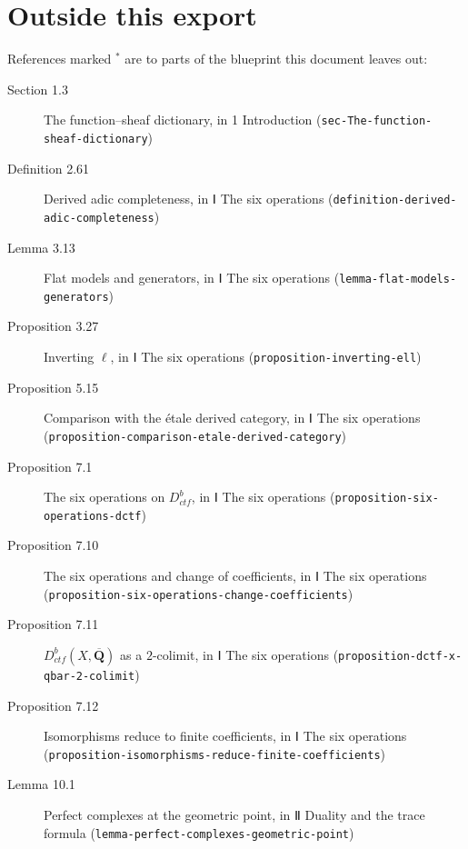 \documentclass[11pt]{article}
\newcommand{\bpslug}[1]{\texttt{#1}}
\providecommand{\Dctf}{}\renewcommand{\Dctf}{D^b_{ctf}}
\providecommand{\Qbar}{}\renewcommand{\Qbar}{\overline{\mathbf Q}}
\begin{document}
\section*{Outside this export}
References marked \ensuremath{{}^\ast} are to parts of the blueprint this document leaves out:
\begin{description}
\item[Section 1.3] The function–sheaf dictionary, in 1 Introduction (\bpslug{sec-{}\allowbreak{}The-{}\allowbreak{}function-{}\allowbreak{}sheaf-{}\allowbreak{}dictionary})
\item[Definition 2.61] Derived adic completeness, in Ⅰ The six operations (\bpslug{definition-{}\allowbreak{}derived-{}\allowbreak{}adic-{}\allowbreak{}completeness})
\item[Lemma 3.13] Flat models and generators, in Ⅰ The six operations (\bpslug{lemma-{}\allowbreak{}flat-{}\allowbreak{}models-{}\allowbreak{}generators})
\item[Proposition 3.27] Inverting $\ell$, in Ⅰ The six operations (\bpslug{proposition-{}\allowbreak{}inverting-{}\allowbreak{}ell})
\item[Proposition 5.15] Comparison with the étale derived category, in Ⅰ The six operations (\bpslug{proposition-{}\allowbreak{}comparison-{}\allowbreak{}etale-{}\allowbreak{}derived-{}\allowbreak{}category})
\item[Proposition 7.1] The six operations on $\Dctf$, in Ⅰ The six operations (\bpslug{proposition-{}\allowbreak{}six-{}\allowbreak{}operations-{}\allowbreak{}dctf})
\item[Proposition 7.10] The six operations and change of coefficients, in Ⅰ The six operations (\bpslug{proposition-{}\allowbreak{}six-{}\allowbreak{}operations-{}\allowbreak{}change-{}\allowbreak{}coefficients})
\item[Proposition 7.11] $\Dctf(X,\Qbar)$ as a $2$-colimit, in Ⅰ The six operations (\bpslug{proposition-{}\allowbreak{}dctf-{}\allowbreak{}x-{}\allowbreak{}qbar-{}\allowbreak{}2-{}\allowbreak{}colimit})
\item[Proposition 7.12] Isomorphisms reduce to finite coefficients, in Ⅰ The six operations (\bpslug{proposition-{}\allowbreak{}isomorphisms-{}\allowbreak{}reduce-{}\allowbreak{}finite-{}\allowbreak{}coefficients})
\item[Lemma 10.1] Perfect complexes at the geometric point, in Ⅱ Duality and the trace formula (\bpslug{lemma-{}\allowbreak{}perfect-{}\allowbreak{}complexes-{}\allowbreak{}geometric-{}\allowbreak{}point})

\end{description}
\end{document}

